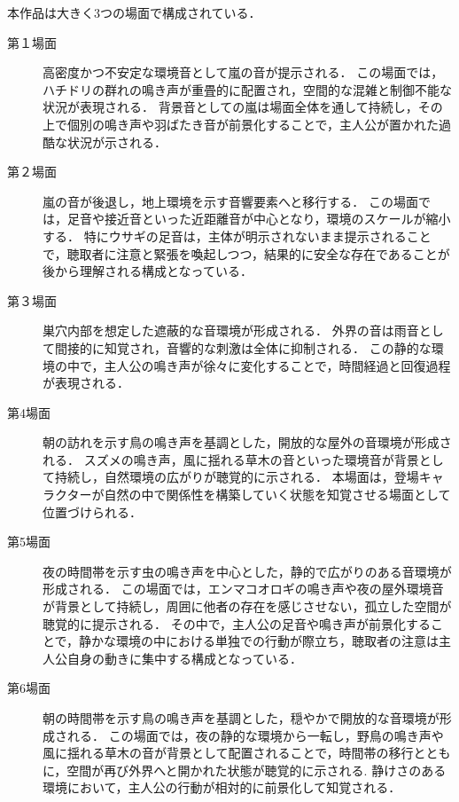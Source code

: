 本作品は大きく3つの場面で構成されている．
\begin{description}
  \item[第１場面] 高密度かつ不安定な環境音として嵐の音が提示される．
        この場面では，ハチドリの群れの鳴き声が重畳的に配置され，空間的な混雑と制御不能な状況が表現される．
        背景音としての嵐は場面全体を通して持続し，その上で個別の鳴き声や羽ばたき音が前景化することで，主人公が置かれた過酷な状況が示される．
  \item [第２場面] 嵐の音が後退し，地上環境を示す音響要素へと移行する．
        この場面では，足音や接近音といった近距離音が中心となり，環境のスケールが縮小する．
        特にウサギの足音は，主体が明示されないまま提示されることで，聴取者に注意と緊張を喚起しつつ，結果的に安全な存在であることが後から理解される構成となっている．

  \item [第３場面] 巣穴内部を想定した遮蔽的な音環境が形成される．
        外界の音は雨音として間接的に知覚され，音響的な刺激は全体に抑制される．
        この静的な環境の中で，主人公の鳴き声が徐々に変化することで，時間経過と回復過程が表現される．
  
  \item [第4場面] 朝の訪れを示す鳥の鳴き声を基調とした，開放的な屋外の音環境が形成される．
        スズメの鳴き声，風に揺れる草木の音といった環境音が背景として持続し，自然環境の広がりが聴覚的に示される．
        本場面は，登場キャラクターが自然の中で関係性を構築していく状態を知覚させる場面として位置づけられる．

  \item [第5場面] 夜の時間帯を示す虫の鳴き声を中心とした，静的で広がりのある音環境が形成される．
        この場面では，エンマコオロギの鳴き声や夜の屋外環境音が背景として持続し，周囲に他者の存在を感じさせない，孤立した空間が聴覚的に提示される．
        その中で，主人公の足音や鳴き声が前景化することで，静かな環境の中における単独での行動が際立ち，聴取者の注意は主人公自身の動きに集中する構成となっている．


  \item [第6場面] 朝の時間帯を示す鳥の鳴き声を基調とした，穏やかで開放的な音環境が形成される．
        この場面では，夜の静的な環境から一転し，野鳥の鳴き声や風に揺れる草木の音が背景として配置されることで，時間帯の移行とともに，空間が再び外界へと開かれた状態が聴覚的に示される.
        静けさのある環境において，主人公の行動が相対的に前景化して知覚される．





    
\end{description}

